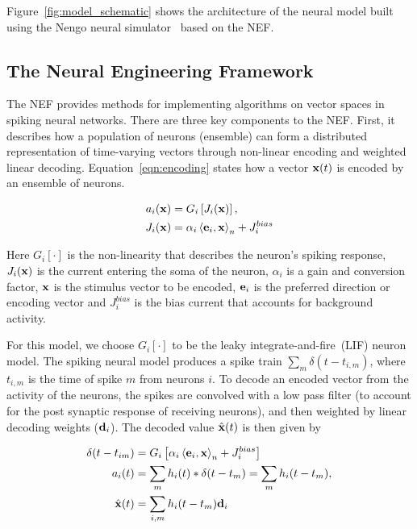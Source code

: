\documentclass[10pt,letterpaper]{article}
\renewcommand{\vec}[1]{{\bf {#1}}}
\newcommand{\dotp}[3]{\left\langle {#1}, {#2} \right\rangle_{#3}}
\newcommand{\lif}[2]{G_{#1} \left[ {#2} \right]}
\begin{document}
Figure~\ref{fig:model_schematic} shows the architecture of the neural model built using the Nengo neural simulator~\cite{bekolay2014nengo} based on the NEF. 

\subsection{The Neural Engineering Framework}
The NEF provides methods for implementing algorithms on vector spaces in spiking neural networks. There are three key components to the NEF. First, it describes how a population of neurons (ensemble) can form a distributed representation of time-varying vectors through non-linear encoding and weighted linear decoding. Equation~\ref{eqn:encoding} states how a vector $\vec{x}(t)$ is encoded by an ensemble of neurons. 

\begin{equation}
\label{eqn:encoding}
\begin{aligned}
a_i(\vec{x}) &= \lif{i}{J_i(\vec{x})}, \\
J_i(\vec{x}) &= \alpha_i \dotp{\vec{e}_i}{\vec{x}}{n} + J_i^{bias}
\end{aligned}
\end{equation}

Here $\lif{i}{\cdot}$ is the non-linearity that describes the neuron's spiking response,  $J_i(\vec{x})$ is the current entering the soma of the neuron, $\alpha_i$ is a gain and conversion factor, $\vec{x}$ is the stimulus vector to be encoded, $\vec{e}_i$ is the preferred direction or encoding vector and $J_i^{bias}$ is the bias current that accounts for background activity.

For this model, we choose $\lif{i}{\cdot}$ to be the leaky integrate-and-fire~(LIF) neuron model. The spiking neural model produces a spike train $\sum_m \delta(t-t_{i,m})$, where $t_{i,m}$ is the time of spike $m$ from neurons $i$. To decode an encoded vector from the activity of the neurons, the spikes are convolved with a low pass filter (to account for the post synaptic response of receiving neurons), and then weighted by linear decoding weights ($\vec{d}_i$). The decoded value $\hat{\vec{x}}(t)$ is then given by

\begin{equation}
\label{eqn:temp_decoding}
\begin{aligned}
\delta(t-t_{im}) &= \lif{i}{\alpha_i \dotp{\vec{e}_i}{\vec{x}}{n} + J_i^{bias}} \\
a_i(t) &= \sum_m h_i(t) \ast \delta(t-t_m) = \sum_m h_i(t-t_m) , \\
\hat{\vec{x}}(t) &= \sum_{i,m} h_i(t-t_m) \vec{d}_i 
\end{aligned}
\end{equation}
\end{document}
